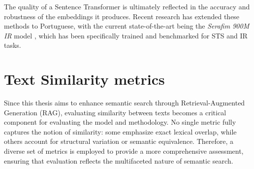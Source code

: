 The quality of a Sentence Transformer is ultimately reflected in the accuracy and robustness of the embeddings it produces. Recent research has extended these methods to Portuguese, with the current state-of-the-art being the \textit{Serafim 900M IR} model \cite{gomes2024opensentenceembeddingsportuguese}, which has been specifically trained and benchmarked for \ac{STS} and \ac{IR} tasks.


\section{Text Similarity metrics}
Since this thesis aims to enhance semantic search through Retrieval-Augmented Generation (\ac{RAG}), 
evaluating similarity between texts becomes a critical component for evaluating the model and methodology. 
No single metric fully captures the notion of similarity: some emphasize exact lexical overlap, 
while others account for structural variation or semantic equivalence. 
Therefore, a diverse set of metrics is employed to provide a more comprehensive assessment, 
ensuring that evaluation reflects the multifaceted nature of semantic search.

